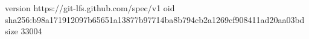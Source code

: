 version https://git-lfs.github.com/spec/v1
oid sha256:b98a171912097b65651a13877b97714ba8b794cb2a1269cf908411ad20aa03bd
size 33004
